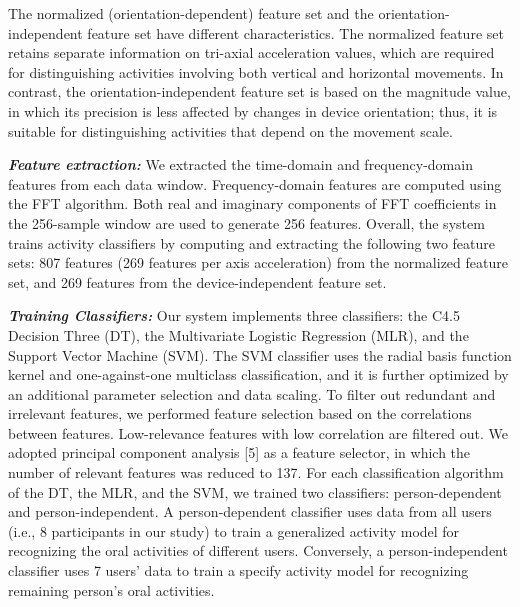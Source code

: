 The normalized (orientation-dependent) feature set and the orientation-independent feature set have different characteristics. The normalized feature set retains separate information on tri-axial acceleration values, which are required for distinguishing activities involving both vertical and horizontal movements. In contrast, the orientation-independent feature set is based on the magnitude value, in which its precision is less affected by changes in device orientation; thus, it is suitable for distinguishing activities that depend on the movement scale.

\textsl{\textbf{Feature extraction:}}
We extracted the time-domain and frequency-domain features from each data window. Frequency-domain features are computed using the FFT algorithm. Both real and imaginary components of FFT coefficients in the 256-sample window are used to generate 256 features. Overall, the system trains activity classifiers by computing and extracting the following two feature sets: 807 features (269 features per axis acceleration) from the normalized feature set, and 269 features from the device-independent feature set.


\textsl{\textbf{Training Classifiers:}}
Our system implements three classifiers: the C4.5 Decision Three (DT), the Multivariate Logistic Regression (MLR), and the Support Vector Machine (SVM). The SVM classifier uses the radial basis function kernel and one-against-one multiclass classification, and it is further optimized by an additional parameter selection and data scaling. To filter out redundant and irrelevant features, we performed feature selection based on the correlations between features. Low-relevance features with low correlation are filtered out. We adopted principal component analysis [5] as a feature selector, in which the number of relevant features was reduced to 137. 
For each classification algorithm of the DT, the MLR, and the SVM, we trained two classifiers: person-dependent and person-independent. A person-dependent classifier uses data from all users (i.e., 8 participants in our study) to train a generalized activity model for recognizing the oral activities of different users. Conversely, a person-independent classifier uses 7 users' data to train a specify activity model for recognizing remaining person's oral activities.

